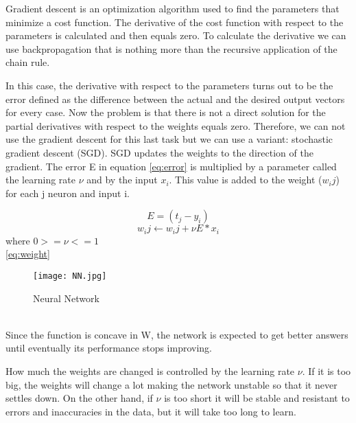 Gradient descent is an optimization algorithm used to find the parameters  that minimize a cost function. The derivative of the cost function with respect to the parameters is calculated and then equals zero. To calculate the derivative we can use backpropagation that is nothing more than the recursive application of the chain rule.

In this case, the derivative with respect to the parameters turns out to be the error defined as the difference between the actual and the desired output vectors for every case. Now the problem is that there is not a direct solution for the partial derivatives with respect to the weights equals zero. Therefore, we can not use the gradient descent for this last task but we can use a variant: stochastic gradient descent (SGD).
SGD updates the weights to the direction of the gradient. The error E in equation \ref{eq:error} is multiplied by a parameter called the learning rate $\nu$ and by the input $x_i$. This value is added to the weight ($w_ij$) for each j neuron and input i.

\begin{equation}
\label{eq:error}
E=(t_j - y_i)
\end{equation}
\begin{equation}
\label{eq:weight}
w_ij \leftarrow w_ij+\nu E * x_i
\end{equation} where $0>=\nu<=1$ \\
\ref{eq:weight}
\begin{figure}
\label{fig:nn}
\center
\texttt{[image: NN.jpg]}
\caption{Neural Network}
\end{figure}
\\
Since the function is concave in W, the network is expected to get better answers until eventually its performance stops improving.

How much the weights are changed is controlled by the learning rate $\nu$. If it is too big, the weights will change a lot  making the network unstable so that it never settles down. On the other hand, if $\nu$ is too short it will be stable and resistant to errors and inaccuracies in the data, but it will take too long to learn. 

